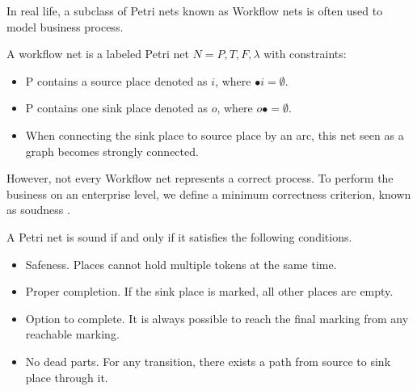 In real life, a subclass of Petri nets known as Workflow nets is often used to model business process.
\begin{definition}
	A workflow net is a labeled Petri net $N={P,T,F,\lambda}$ with constraints: 
	\begin{itemize}
		\itemsep-0.5em 
		\item P contains a source place denoted as $i$, where $ \bullet i=\emptyset$.
		\item P contains one sink place denoted as $o$, where $ o\bullet =\emptyset$.
		\item When connecting the sink place to source place by an arc, this net seen as a graph becomes strongly connected.
	\end{itemize}
\end{definition}   
However, not every Workflow net represents a correct process. To perform the business on an enterprise level, we define a minimum correctness criterion, known as soudness \cite{van2006structural}. 
\begin{definition}[Soundness]
	A Petri net is sound if and only if it satisfies the following conditions.
	\begin{itemize}
		\itemsep-0.5em 
		\item Safeness. Places cannot hold multiple tokens at the same time.
		\item Proper completion. If the sink place is marked, all other places are empty.
		\item Option to complete. It is always possible to reach the final marking from any reachable marking.
		\item No dead parts. For any transition, there exists a path from source to sink place through it. 
	\end{itemize}
\end{definition}


